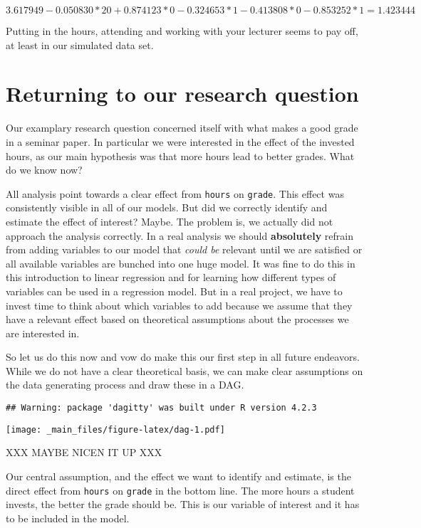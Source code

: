 \documentclass[
]{book}
\begin{document}
\[3.617949 - 0.050830 * 20 + 0.874123 * 0 - 0.324653 * 1 - 0.413808 * 0 - 0.853252 * 1 = 1.423444\]

Putting in the hours, attending and working with your lecturer seems to pay off,
at least in our simulated data set.

\hypertarget{returning-to-our-research-question}{%
\section{Returning to our research question}\label{returning-to-our-research-question}}

Our examplary research question concerned itself with what makes a good grade in
a seminar paper. In particular we were interested in the effect of the invested
hours, as our main hypothesis was that more hours lead to better grades. What do
we know now?

All analysis point towards a clear effect from \texttt{hours} on \texttt{grade}. This effect
was consistently visible in all of our models. But did we correctly identify
and estimate the effect of interest? Maybe. The problem is, we actually did not
approach the analysis correctly. In a real analysis we should \textbf{absolutely}
refrain from adding variables to our model that \emph{could be} relevant until we are
satisfied or all available variables are bunched into one huge model. It was
fine to do this in this introduction to linear regression and for learning how
different types of variables can be used in a regression model. But in a real
project, we have to invest time to think about which variables to add because we
assume that they have a relevant effect based on theoretical assumptions about
the processes we are interested in.

So let us do this now and vow do make this our first step in all future
endeavors. While we do not have a clear theoretical basis, we can make clear
assumptions on the data generating process and draw these in a DAG.

\begin{verbatim}
## Warning: package 'dagitty' was built under R version 4.2.3
\end{verbatim}

\texttt{[image: \_main\_files/figure-latex/dag-1.pdf]}

XXX MAYBE NICEN IT UP XXX

Our central assumption, and the effect we want to identify and estimate, is the
direct effect from \texttt{hours} on \texttt{grade} in the bottom line. The more hours a
student invests, the better the grade should be. This is our variable of
interest and it has to be included in the model.
\end{document}
